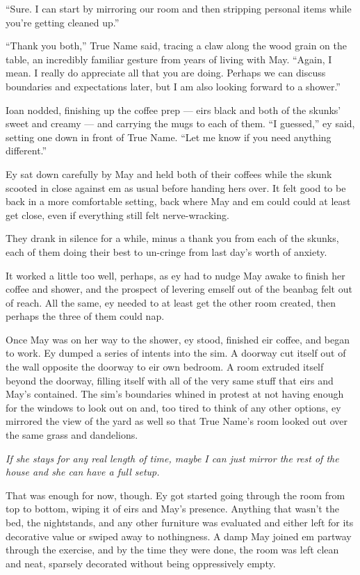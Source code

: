 ``Sure. I can start by mirroring our room and then stripping personal items while you're getting cleaned up.''

``Thank you both,'' True Name said, tracing a claw along the wood grain on the table, an incredibly familiar gesture from years of living with May. ``Again, I mean. I really do appreciate all that you are doing. Perhaps we can discuss boundaries and expectations later, but I am also looking forward to a shower.''

Ioan nodded, finishing up the coffee prep — eirs black and both of the skunks' sweet and creamy — and carrying the mugs to each of them. ``I guessed,'' ey said, setting one down in front of True Name. ``Let me know if you need anything different.''

Ey sat down carefully by May and held both of their coffees while the skunk scooted in close against em as usual before handing hers over. It felt good to be back in a more comfortable setting, back where May and em could could at least get close, even if everything still felt nerve-wracking.

They drank in silence for a while, minus a thank you from each of the skunks, each of them doing their best to un-cringe from last day's worth of anxiety.

It worked a little too well, perhaps, as ey had to nudge May awake to finish her coffee and shower, and the prospect of levering emself out of the beanbag felt out of reach. All the same, ey needed to at least get the other room created, then perhaps the three of them could nap.

Once May was on her way to the shower, ey stood, finished eir coffee, and began to work. Ey dumped a series of intents into the sim. A doorway cut itself out of the wall opposite the doorway to eir own bedroom. A room extruded itself beyond the doorway, filling itself with all of the very same stuff that eirs and May's contained. The sim's boundaries whined in protest at not having enough for the windows to look out on and, too tired to think of any other options, ey mirrored the view of the yard as well so that True Name's room looked out over the same grass and dandelions.

\emph{If she stays for any real length of time, maybe I can just mirror the rest of the house and she can have a full setup.}

That was enough for now, though. Ey got started going through the room from top to bottom, wiping it of eirs and May's presence. Anything that wasn't the bed, the nightstands, and any other furniture was evaluated and either left for its decorative value or swiped away to nothingness. A damp May joined em partway through the exercise, and by the time they were done, the room was left clean and neat, sparsely decorated without being oppressively empty.

